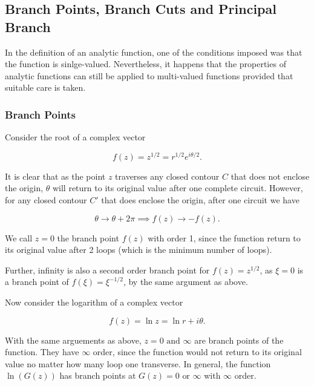 \documentclass[english,a4paper,12pt]{report}
\begin{document}
\subsection{Branch Points, Branch Cuts and Principal Branch}

In the definition of an analytic function, one of the conditions imposed was that the function is sinlge-valued. Nevertheless, it happens that the properties of analytic functions can still be applied to multi-valued functions provided that suitable care is taken. 

\subsubsection{Branch Points}

Consider the root of a complex vector

\begin{equation}
    f(z) = z^{1/2} = r^{1 /2} e^{i \theta /2}.
\end{equation}

It is clear that as the point \(z\) traverses any closed contour \(C\) that does not enclose the origin, \(\theta \) will return to its original value after one complete circuit. However, for any closed contour \(C'\) that does enclose the origin, after one circuit we have 

\begin{equation}
    \theta \to \theta +2\pi \implies f(z) \to -f(z).
\end{equation}

We call \(z = 0\) the branch point \(f(z)\) with order 1, since the function return to its original value after 2 loops (which is the minimum number of loops).

Further, infinity is also a second order branch point for \(f(z) = z^{1 /2} \), as \(\xi =0\) is a branch point of \(f(\xi ) = \xi ^{- 1/2} \), by the same argument as above.  

Now consider the logarithm of a complex vector

\begin{equation}
    f(z) = \ln z = \ln r + i \theta .
\end{equation}

With the same arguements as above, \(z = 0 \text { and } \infty\) are branch points of the function. They have \(\infty\) order, since the function would not return to its original value no matter how many loop one transverse. In general, the function \(\ln (G(z))\) has branch points at \(G(z) = 0 \text { or } \infty\) with \(\infty\) order.   
\end{document}
